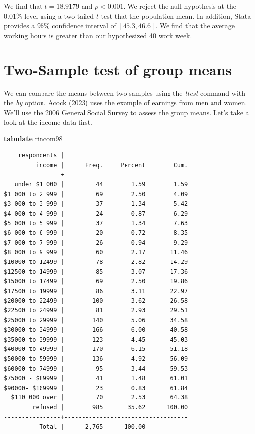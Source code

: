 \documentclass[
]{book}
\newenvironment{Shaded}{\begin{snugshade}}{\end{snugshade}}
\newcommand{\KeywordTok}[1]{\textcolor[rgb]{0.13,0.29,0.53}{\textbf{#1}}}
\newcommand{\NormalTok}[1]{#1}
\begin{document}
We find that \(t=18.9179\) and \(p<0.001\). We reject the null hypothesis at the \(0.01\%\) level using a two-tailed \(t\)-test that the population mean. In addition, Stata provides a \(95\%\) confidence interval of \([45.3,46.6]\). We find that the average working hours is greater than our hypothesized 40 work week.

\section{Two-Sample test of group means}\label{two-sample-test-of-group-means}

We can compare the means between two samples using the \emph{ttest} command with the \emph{by} option. Acock (2023) uses the example of earnings from men and women. We'll use the 2006 General Social Survey to assess the group means. Let's take a look at the income data first.

\begin{Shaded}
\begin{Highlighting}[]
\KeywordTok{tabulate}\NormalTok{ rincom98}
\end{Highlighting}
\end{Shaded}

\begin{verbatim}
    respondents |
         income |      Freq.     Percent        Cum.
----------------+-----------------------------------
   under $1 000 |         44        1.59        1.59
$1 000 to 2 999 |         69        2.50        4.09
$3 000 to 3 999 |         37        1.34        5.42
$4 000 to 4 999 |         24        0.87        6.29
$5 000 to 5 999 |         37        1.34        7.63
$6 000 to 6 999 |         20        0.72        8.35
$7 000 to 7 999 |         26        0.94        9.29
$8 000 to 9 999 |         60        2.17       11.46
$10000 to 12499 |         78        2.82       14.29
$12500 to 14999 |         85        3.07       17.36
$15000 to 17499 |         69        2.50       19.86
$17500 to 19999 |         86        3.11       22.97
$20000 to 22499 |        100        3.62       26.58
$22500 to 24999 |         81        2.93       29.51
$25000 to 29999 |        140        5.06       34.58
$30000 to 34999 |        166        6.00       40.58
$35000 to 39999 |        123        4.45       45.03
$40000 to 49999 |        170        6.15       51.18
$50000 to 59999 |        136        4.92       56.09
$60000 to 74999 |         95        3.44       59.53
$75000 - $89999 |         41        1.48       61.01
$90000- $109999 |         23        0.83       61.84
  $110 000 over |         70        2.53       64.38
        refused |        985       35.62      100.00
----------------+-----------------------------------
          Total |      2,765      100.00
\end{verbatim}
\end{document}
